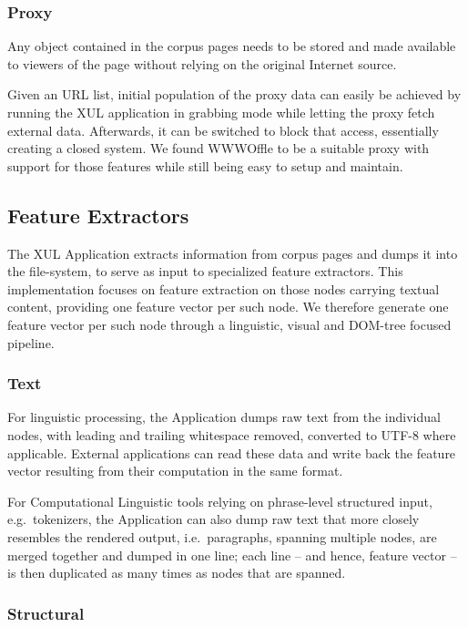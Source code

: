 \subsubsection{Proxy}

Any object contained in the corpus pages needs to be stored and made available to viewers of the page without relying on the original Internet source.

Given an URL list, initial population of the proxy data can easily be achieved by running the XUL application in grabbing mode while letting the proxy fetch external data.
Afterwards, it can be switched to block that access, essentially creating a closed system.
We found WWWOffle to be a suitable proxy with support for those features while still being easy to setup and maintain.

\subsection{Feature Extractors\label{extract}}

The XUL Application extracts information from corpus pages and dumps it into the file-system, to serve as input to specialized feature extractors.
This implementation focuses on feature extraction on those nodes carrying textual content, providing one feature vector per such node.
We therefore generate one feature vector per such node through a linguistic, visual and DOM-tree focused pipeline.

\subsubsection{Text}

For linguistic processing, the Application dumps raw text from the individual nodes, with leading and trailing whitespace removed, converted to UTF-8 where applicable.
External applications can read these data and write back the feature vector resulting from their computation in the same format.

For Computational Linguistic tools relying on phrase-level structured input,
e.g.~tokenizers,
the Application can also dump raw text that more closely resembles the rendered output,
i.e.~paragraphs, spanning multiple nodes, are merged together and dumped in one line;
each line -- and hence, feature vector -- is then duplicated as many times as nodes that are spanned.

\subsubsection{Structural}


